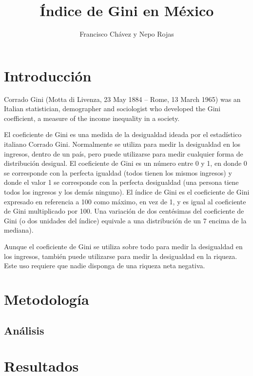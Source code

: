 \documentclass{article}
\author{Francisco Chávez y Nepo Rojas}
\title{Índice de Gini en México}
\begin{document}
\begin{pycode}
\end{pycode}

\maketitle
\begin{abstract}
\end{abstract}

\section*{Introducción}
Corrado Gini (Motta di Livenza, 23 May 1884 – Rome, 13 March 1965) was an Italian statistician,
demographer and sociologist who developed the Gini coefficient, a measure of the income inequality
in a society.

El coeficiente de Gini es una medida de la desigualdad ideada por el estadístico italiano Corrado
Gini. Normalmente se utiliza para medir la desigualdad en los ingresos, dentro de un país, pero
puede utilizarse para medir cualquier forma de distribución desigual. El coeficiente de Gini es un
número entre 0 y 1, en donde 0 se corresponde con la perfecta igualdad (todos tienen los mismos
ingresos) y donde el valor 1 se corresponde con la perfecta desigualdad (una persona tiene todos los
ingresos y los demás ninguno). El índice de Gini es el coeficiente de Gini expresado en referencia a
100 como máximo, en vez de 1, y es igual al coeficiente de Gini multiplicado por 100. Una variación
de dos centésimas del coeficiente de Gini (o dos unidades del índice) equivale a una distribución de
un 7%
encima de la mediana).

Aunque el coeficiente de Gini se utiliza sobre todo para medir la desigualdad en los ingresos,
también puede utilizarse para medir la desigualdad en la riqueza. Este uso requiere que nadie
disponga de una riqueza neta negativa.\cite{carpenter2000}

\section*{Metodología}

\subsection*{Análisis}


\section*{Resultados}

 

\end{document}
